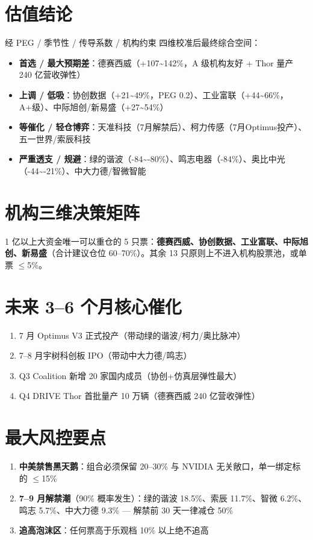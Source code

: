 \section{估值结论}

经 PEG / 季节性 / 传导系数 / 机构约束 四维校准后最终综合空间：

\begin{itemize}[leftmargin=2em]
  \item \gmark{} \textbf{首选 / 最大预期差}：德赛西威（+107\textasciitilde142\%，A 级机构友好 + Thor 量产 240 亿营收弹性）
  \item \gmark{} \textbf{上调 / 低吸}：协创数据（+21\textasciitilde49\%，PEG 0.2）、工业富联（+44\textasciitilde66\%，A+级）、中际旭创/新易盛（+27\textasciitilde54\%）
  \item \amark{} \textbf{等催化 / 轻仓博弈}：天准科技（7月解禁后）、柯力传感（7月Optimus投产）、五一世界/索辰科技
  \item \rmark{} \textbf{严重透支 / 规避}：绿的谐波（-84\textasciitilde-80\%）、鸣志电器（-84\%）、奥比中光（-44\textasciitilde-21\%）、中大力德/智微智能
\end{itemize}

\section{机构三维决策矩阵}

1 亿以上大资金唯一可以重仓的 5 只票：\textbf{德赛西威、协创数据、工业富联、中际旭创、新易盛}（合计建议仓位 60--70\%）。其余 13 只原则上不进入机构股票池，或单票 $\leq$5\%。

\section{未来 3--6 个月核心催化}

\begin{enumerate}[leftmargin=2em]
  \item 7 月 Optimus V3 正式投产（带动绿的谐波/柯力/奥比脉冲）
  \item 7--8 月宇树科创板 IPO（带动中大力德/鸣志）
  \item Q3 Coalition 新增 20 家国内成员（协创+仿真层弹性最大）
  \item Q4 DRIVE Thor 首批量产 10 万辆（德赛西威 240 亿营收弹性）
\end{enumerate}

\section{最大风控要点}

\begin{riskbox}
\begin{enumerate}[leftmargin=1.5em]
  \item \textbf{中美禁售黑天鹅}：组合必须保留 20--30\% 与 NVIDIA 无关敞口，单一绑定标的 $\leq$15\%
  \item \textbf{7--9 月解禁潮}（90\% 概率发生）：绿的谐波 18.5\%、索辰 11.7\%、智微 6.2\%、鸣志 5.7\%、中大力德 9.3\% --- 解禁前 30 天一律减仓 50\%
  \item \textbf{追高泡沫区}：任何票高于乐观档 10\% 以上绝不追高
\end{enumerate}
\end{riskbox}

